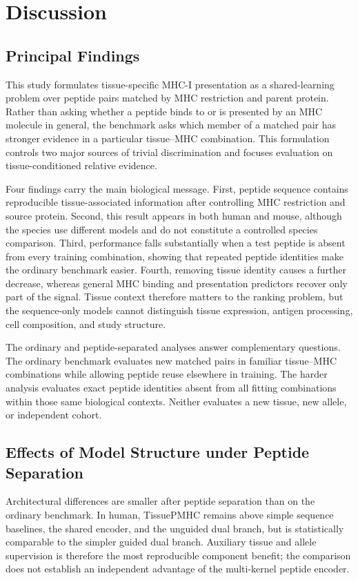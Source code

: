 \section{Discussion}

\subsection{Principal Findings}

This study formulates tissue-specific MHC-I presentation as a shared-learning problem over peptide pairs matched by MHC restriction and parent protein. Rather than asking whether a peptide binds to or is presented by an MHC molecule in general, the benchmark asks which member of a matched pair has stronger evidence in a particular tissue--MHC combination. This formulation controls two major sources of trivial discrimination and focuses evaluation on tissue-conditioned relative evidence.

Four findings carry the main biological message. First, peptide sequence contains reproducible tissue-associated information after controlling MHC restriction and source protein. Second, this result appears in both human and mouse, although the species use different models and do not constitute a controlled species comparison. Third, performance falls substantially when a test peptide is absent from every training combination, showing that repeated peptide identities make the ordinary benchmark easier. Fourth, removing tissue identity causes a further decrease, whereas general MHC binding and presentation predictors recover only part of the signal. Tissue context therefore matters to the ranking problem, but the sequence-only models cannot distinguish tissue expression, antigen processing, cell composition, and study structure.

The ordinary and peptide-separated analyses answer complementary questions. The ordinary benchmark evaluates new matched pairs in familiar tissue--MHC combinations while allowing peptide reuse elsewhere in training. The harder analysis evaluates exact peptide identities absent from all fitting combinations within those same biological contexts. Neither evaluates a new tissue, new allele, or independent cohort.

\subsection{Effects of Model Structure under Peptide Separation}

Architectural differences are smaller after peptide separation than on the ordinary benchmark. In human, TissuePMHC remains above simple sequence baselines, the shared encoder, and the unguided dual branch, but is statistically comparable to the simpler guided dual branch. Auxiliary tissue and allele supervision is therefore the most reproducible component benefit; the comparison does not establish an independent advantage of the multi-kernel peptide encoder.

